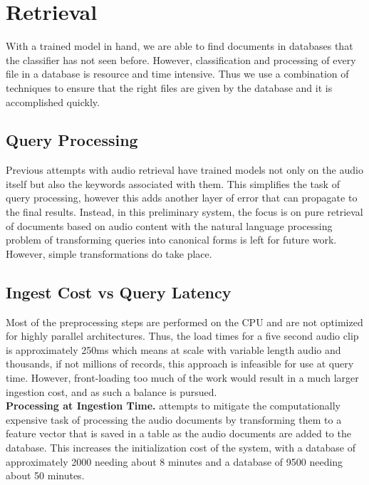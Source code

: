\section{Retrieval}

With a trained model in hand, we are able to find documents in databases that the classifier has not seen before. However, classification and processing of every file in a database is resource and time intensive. Thus we use a combination of techniques to ensure that the right files are given by the database and it is accomplished quickly.

\subsection{Query Processing}
Previous attempts with audio retrieval have trained models not only on the audio itself but also the keywords associated with them. This simplifies the task of query processing, however this adds another layer of error that can propagate to the final results. Instead, in this preliminary system, the focus is on pure retrieval of documents based on audio content with the natural language processing problem of transforming queries into canonical forms is left for future work. However, simple transformations do take place.

\subsection{Ingest Cost vs Query Latency}
Most of the preprocessing steps are performed on the CPU and are not optimized for highly parallel architectures. Thus, the load times for a five second audio clip is approximately 250ms which means at scale with variable length audio and thousands, if not millions of records, this approach is infeasible for use at query time. However, front-loading too much of the work would result in a much larger ingestion cost, and as such a balance is pursued.
\\
\textbf{Processing at Ingestion Time.} \sys attempts to mitigate the computationally expensive task of processing the audio documents by transforming them to a feature vector that is saved in a table as the audio documents are added to the database. This increases the initialization cost of the system, with a database of approximately 2000 needing about 8 minutes and a database of 9500 needing about 50 minutes.
